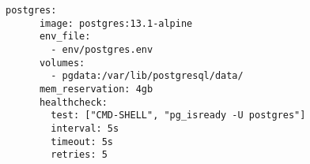 \begin{lstlisting}[language=docker-compose-2,caption={\acrlong{pg} Docker Compose configuration},breaklines=true,label={lst:postgresDockerCompose}]
    postgres:
      image: postgres:13.1-alpine
      env_file:
        - env/postgres.env
      volumes:
        - pgdata:/var/lib/postgresql/data/
      mem_reservation: 4gb
      healthcheck:
        test: ["CMD-SHELL", "pg_isready -U postgres"]
        interval: 5s
        timeout: 5s
        retries: 5
  \end{lstlisting}
